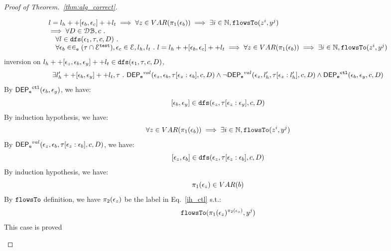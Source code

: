 \documentclass[a4paper,11pt]{article}
\begin{document}
\begin{proof}[Proof of Theorem.~\ref{thm:alg_correct}]
\begin{case}
\begin{subcase}
\[\begin{array}{l}
   l = l_h ++ [ \mathtt{\epsilon}_b, \mathtt{\epsilon}_c] ++ l_t 
   \implies \forall z \in VAR(\pi_1(\mathtt{\epsilon}_b)) \implies \exists i \in \mathbb{N}, \mathtt{flowsTo}(z^i, y^j)
   \\
   \implies
   \forall D \in \mathcal{DB} , c ~.~
  \\ \quad 
   \forall l \in \mathtt{dfs}(\mathtt{\epsilon}_1, \mathtt{\tau}, c, D) ~.~
   \\ \quad 
   \forall \mathtt{\epsilon}_b \in \in_{\mathtt{e}} (\mathtt{\tau} \cap \mathcal{E}^{\mathtt{{test}}}), \mathtt{\epsilon}_c \in \mathcal{E}, l_h, l_t ~.~ 
   l = l_h ++ [ \mathtt{\epsilon}_b, \mathtt{\epsilon}_c] ++ l_t 
   \implies \forall z \in VAR(\pi_1(\mathtt{\epsilon}_b)) \implies \exists i \in \mathbb{N}, \mathtt{flowsTo}(z^i, y^j)
\end{array}
\]
inversion on  $l_h ++ {[\mathtt{\epsilon}_z,  \mathtt{\epsilon}_b, \mathtt{\epsilon}_y]} ++ l_t \in \mathtt{dfs}(\mathtt{\epsilon}_1, \mathtt{\tau}, c, D)$, 
\[
  \exists l_{h}' ++ [\mathtt{\epsilon}_b, \mathtt{\epsilon}_y] ++ l_t, \mathtt{\tau} ~.~
  \mathsf{DEP_{\mathtt{e}}}^{val}(\mathtt{\epsilon}_z, \mathtt{\epsilon}_b, \mathtt{\tau}[\mathtt{\epsilon}_z: \mathtt{\epsilon}_b], c, D)
  \land 
  \neg \mathsf{DEP_{\mathtt{e}}}^{val} (\mathtt{\epsilon}_z, l_h', \mathtt{\tau}[\mathtt{\epsilon}_z: l_h'], c, D)
  \land 
  \mathsf{DEP_{\mathtt{e}}}^{\mathtt{{ctl}}} (\mathtt{\epsilon}_b, \mathtt{\epsilon}_y, c, D)
\]
%
By $\mathsf{DEP_{\mathtt{e}}}^{\mathtt{{ctl}}} (\mathtt{\epsilon}_b, \mathtt{\epsilon}_y) $, we have:
\[
  [\mathtt{\epsilon}_b, \mathtt{\epsilon}_y]\in \mathtt{dfs}(\mathtt{\epsilon}_{z}, \mathtt{\tau}[\mathtt{\epsilon}_{z}:\mathtt{\epsilon}_{y}], c, D)
\]
%
By induction hypothesis, we have:
\begin{equation}
\label{ih_ctl}
  \forall z \in VAR(\pi_1(\mathtt{\epsilon}_b)) \implies \exists i \in \mathbb{N}, \mathtt{flowsTo}(z^i, y^j)
\end{equation}
%
By $\mathsf{DEP_{\mathtt{e}}}^{val}(\mathtt{\epsilon}_z, \mathtt{\epsilon}_b, \mathtt{\tau}[\mathtt{\epsilon}_z: \mathtt{\epsilon}_b], c, D)$, we have:
\[
  [\mathtt{\epsilon}_z, \mathtt{\epsilon}_b]\in \mathtt{dfs}(\mathtt{\epsilon}_{z}, \mathtt{\tau}[\mathtt{\epsilon}_{z}:\mathtt{\epsilon}_{b}], c, D)
\]
%
By induction hypothesis, we have:
\[
  \pi_1(\mathtt{\epsilon}_z) \in VAR(b)
\]
%
By $\mathtt{flowsTo}$ definition, we have $\pi_2(\mathtt{\epsilon}_z)$ be the label in Eq.~\ref{ih_ctl} s.t.:
\[
  \mathtt{flowsTo}(\pi_1(\mathtt{\epsilon}_z)^{\pi_2(\mathtt{\epsilon}_z)}, y^j)
\]
%
This case is proved
%
%
\end{subcase}

\end{case}
\end{proof}
\end{document}
